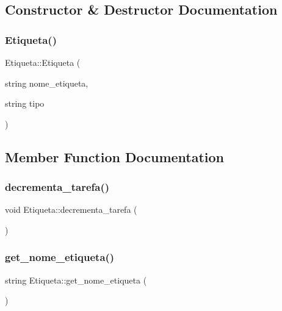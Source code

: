 \subsection{Constructor \& Destructor Documentation}
\mbox{\label{classEtiqueta_aef0684cb6dc41c4f6f602b184ec64bce}} 
\subsubsection{\texorpdfstring{Etiqueta()}{Etiqueta()}}
{\footnotesize\ttfamily Etiqueta\+::\+Etiqueta (\begin{DoxyParamCaption}\item[{string}]{nome\+\_\+etiqueta,  }\item[{string}]{tipo }\end{DoxyParamCaption})}



\subsection{Member Function Documentation}
\mbox{\label{classEtiqueta_a01a51067b14191eba6f0fd7ac5d7a5bb}} 
\subsubsection{\texorpdfstring{decrementa\+\_\+tarefa()}{decrementa\_tarefa()}}
{\footnotesize\ttfamily void Etiqueta\+::decrementa\+\_\+tarefa (\begin{DoxyParamCaption}{ }\end{DoxyParamCaption})}

\mbox{\label{classEtiqueta_a19d4e9c998e6b7fab0dafc88e9c7b9e2}} 
\subsubsection{\texorpdfstring{get\+\_\+nome\+\_\+etiqueta()}{get\_nome\_etiqueta()}}
{\footnotesize\ttfamily string Etiqueta\+::get\+\_\+nome\+\_\+etiqueta (\begin{DoxyParamCaption}{ }\end{DoxyParamCaption})}

